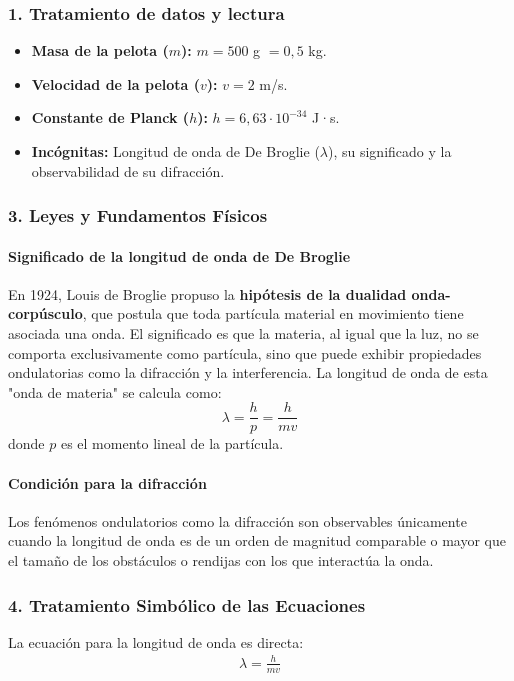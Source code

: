 \subsubsection*{1. Tratamiento de datos y lectura}
\begin{itemize}
    \item \textbf{Masa de la pelota ($m$):} $m = 500$ g $= 0,5$ kg.
    \item \textbf{Velocidad de la pelota ($v$):} $v = 2$ m/s.
    \item \textbf{Constante de Planck ($h$):} $h = 6,63 \cdot 10^{-34}$ J·s.
    \item \textbf{Incógnitas:} Longitud de onda de De Broglie ($\lambda$), su significado y la observabilidad de su difracción.
\end{itemize}

\subsubsection*{3. Leyes y Fundamentos Físicos}
\paragraph{Significado de la longitud de onda de De Broglie}
En 1924, Louis de Broglie propuso la \textbf{hipótesis de la dualidad onda-corpúsculo}, que postula que toda partícula material en movimiento tiene asociada una onda. El significado es que la materia, al igual que la luz, no se comporta exclusivamente como partícula, sino que puede exhibir propiedades ondulatorias como la difracción y la interferencia. La longitud de onda de esta "onda de materia" se calcula como:
$$ \lambda = \frac{h}{p} = \frac{h}{mv} $$
donde $p$ es el momento lineal de la partícula.
\paragraph{Condición para la difracción}
Los fenómenos ondulatorios como la difracción son observables únicamente cuando la longitud de onda es de un orden de magnitud comparable o mayor que el tamaño de los obstáculos o rendijas con los que interactúa la onda.

\subsubsection*{4. Tratamiento Simbólico de las Ecuaciones}
La ecuación para la longitud de onda es directa:
\begin{gather}
    \lambda = \frac{h}{mv}
\end{gather}

